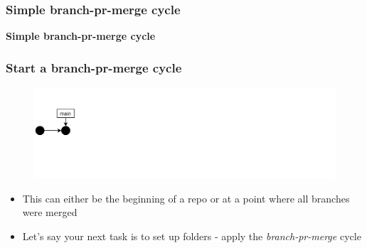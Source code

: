 \documentclass[aspectratio=169]{beamer} %
\begin{document}
\begin{frame}
	\frametitle{Simple branch-pr-merge cycle}
	
	\huge\centering \textbf{Simple branch-pr-merge cycle}
	
\end{frame}


\begin{frame}
	\frametitle{Start a branch-pr-merge cycle}
	
	\vspace{-.5cm}
	\begin{minipage}[t][5cm][t]{\textwidth}
		\begin{figure}
			\centering
			\includegraphics[width=\textwidth]{./img/dime-gitflow-network-0.png}
		\end{figure}
	\end{minipage}  
	
	\vspace{-.5cm}
	\begin{minipage}[t][5cm][t]{\textwidth}
		\begin{itemize}
			\setlength\itemsep{.5em}
			\item This can either be the beginning of a repo or at a point where all branches were merged
			\item Let's say your next task is to set up folders - apply the \textit{branch-pr-merge} cycle
		\end{itemize}
	\end{minipage}  
	
\end{frame}
\end{document}
